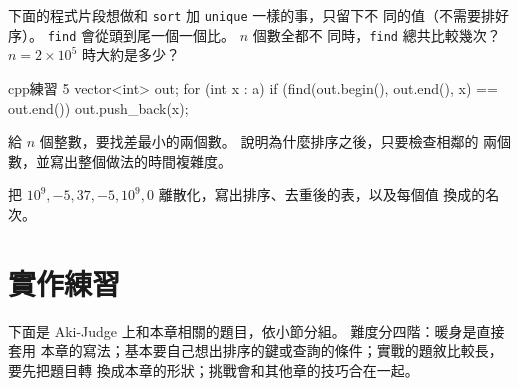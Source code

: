 \begin{drills}[label=drills:ch2]
\item 下面的程式片段想做和 \texttt{sort} 加 \texttt{unique} 一樣的事，只留下不
同的值（不需要排好序）。 \texttt{find} 會從頭到尾一個一個比。 $n$ 個數全都不
同時，\texttt{find} 總共比較幾次？ $n = 2 \times 10^5$ 時大約是多少？
\begin{code}{cpp}{練習 5}
vector<int> out;
for (int x : a) {
    if (find(out.begin(), out.end(), x) == out.end()) {
        out.push_back(x);
    }
}
\end{code}

\item 給 $n$ 個整數，要找差最小的兩個數。 說明為什麼排序之後，只要檢查相鄰的
兩個數，並寫出整個做法的時間複雜度。

\item 把 $10^9, -5, 37, -5, 10^9, 0$ 離散化，寫出排序、去重後的表，以及每個值
換成的名次。
\end{drills}

\section{實作練習}
\label{sec:srt-practice}

下面是 Aki-Judge 上和本章相關的題目，依小節分組。 難度分四階：暖身是直接套用
本章的寫法；基本要自己想出排序的鍵或查詢的條件；實戰的題敘比較長，要先把題目轉
換成本章的形狀；挑戰會和其他章的技巧合在一起。

